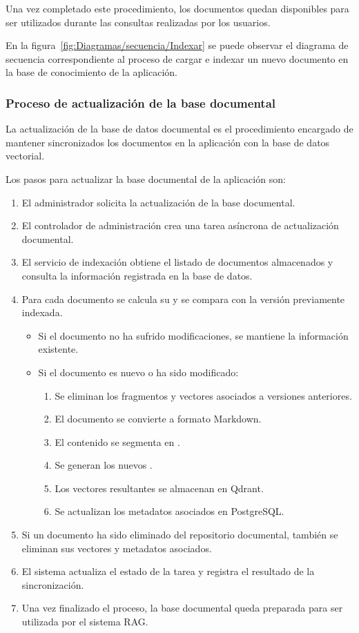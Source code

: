 Una vez completado este procedimiento, los documentos quedan disponibles para ser utilizados durante las consultas realizadas por los usuarios.

En la figura~\ref{fig:Diagramas/secuencia/Indexar} se puede observar el diagrama de secuencia correspondiente al proceso de cargar e indexar un nuevo documento en la base de conocimiento de la aplicación.


\subsubsection{Proceso de actualización de la base documental}

La actualización de la base de datos documental es el procedimiento encargado de mantener sincronizados los documentos en la aplicación con la base de datos vectorial. 

Los pasos para actualizar la base documental de la aplicación son:
\begin{enumerate}
	\item El administrador solicita la actualización de la base documental.
	\item El controlador de administración crea una tarea asíncrona de actualización documental.
	\item El servicio de indexación obtiene el listado de documentos almacenados y consulta la información registrada en la base de datos.
	\item Para cada documento se calcula su  y se compara con la versión previamente indexada.
	\begin{itemize}
		\item Si el documento no ha sufrido modificaciones, se mantiene la información existente.
		\item Si el documento es nuevo o ha sido modificado:
		\begin{enumerate}
			\item Se eliminan los fragmentos y vectores asociados a versiones anteriores.
			\item El documento se convierte a formato Markdown.
			\item El contenido se segmenta en .
			\item Se generan los nuevos .
			\item Los vectores resultantes se almacenan en Qdrant.
			\item Se actualizan los metadatos asociados en PostgreSQL.
		\end{enumerate}
	\end{itemize}
	\item Si un documento ha sido eliminado del repositorio documental, también se eliminan sus vectores y metadatos asociados.
	\item El sistema actualiza el estado de la tarea y registra el resultado de la sincronización.
	\item Una vez finalizado el proceso, la base documental queda preparada para ser utilizada por el sistema RAG.
\end{enumerate}

